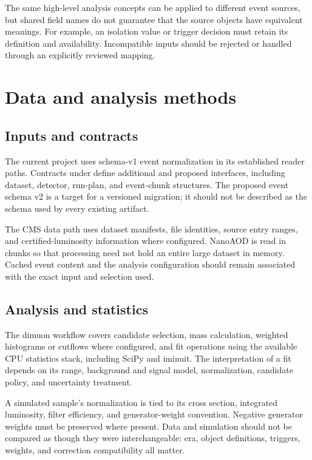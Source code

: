 \documentclass[11pt,a4paper]{article}
\begin{document}
The same high-level analysis concepts can be applied to different event
sources, but shared field names do not guarantee that the source objects have
equivalent meanings. For example, an isolation value or trigger decision must
retain its definition and availability. Incompatible inputs should be rejected
or handled through an explicitly reviewed mapping.

\section{Data and analysis methods}

\subsection{Inputs and contracts}

The current project uses schema-v1 event normalization in its established
reader paths. Contracts under  define additional and
proposed interfaces, including dataset, detector, run-plan, and event-chunk
structures. The proposed event schema v2 is a target for a versioned
migration; it should not be described as the schema used by every existing
artifact.

The CMS data path uses dataset manifests, file identities, source entry ranges,
and certified-luminosity information where configured. NanoAOD is read in
chunks so that processing need not hold an entire large dataset in memory.
Cached event content and the analysis configuration should remain associated
with the exact input and selection used.

\subsection{Analysis and statistics}

The dimuon workflow covers candidate selection, mass calculation, weighted
histograms or cutflows where configured, and fit operations using the available
CPU statistics stack, including SciPy and iminuit. The interpretation of a fit
depends on its range, background and signal model, normalization, candidate
policy, and uncertainty treatment.

A simulated sample's normalization is tied to its cross section, integrated
luminosity, filter efficiency, and generator-weight convention. Negative
generator weights must be preserved where present. Data and simulation should
not be compared as though they were interchangeable: era, object definitions,
triggers, weights, and correction compatibility all matter.
\end{document}
